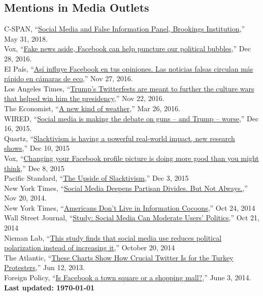 \documentclass[margin,line,11pt]{resume}
\newcommand{\nl}{\vspace{0.10in}\\}
\begin{document}
\begin{resume}
                \section{\mysidestyle Mentions in Media Outlets}
C-SPAN, ``\href{https://www.c-span.org/video/?446330-3/social-media-false-information-panel-2}{Social Media and False Information Panel, Brookings Institution},'' May 31, 2018.\nl                
Vox, ``\href{http://www.vox.com/the-big-idea/2016/12/28/14095452/fake-news-political-bubbles-democracy-facebook}{Fake news aside, Facebook can help puncture our political bubbles},'' Dec 28, 2016.\nl
El Pa\'{i}s, ``\href{http://internacional.elpais.com/internacional/2016/11/25/actualidad/1480095728_565471.html}{As\'{i} influye Facebook en tus opiniones. Las noticias falsas circulan m\'{a}s r\'{a}pido en c\'{a}maras de eco},'' Nov 27, 2016.\nl
Los Angeles Times, ``\href{http://www.latimes.com/politics/la-na-pol-trump-twitter-20161122-story.html}{Trump's Twitterfests are meant to further the culture wars that helped win him the presidency},'' Nov 22, 2016.\nl 
The Economist, ``\href{http://www.economist.com/news/special-report/21695192-social-media-now-play-key-role-collective-action-new-kind-weather}{A new kind of weather},'' Mar 26, 2016.\nl
WIRED, ``\href{http://www.wired.com/2015/12/social-media-is-making-the-debate-on-guns-and-trump-worse/}{Social media is making the debate on guns -- and Trump -- worse},'' Dec 16, 2015.\nl
Quartz, ``\href{http://qz.com/570009/slacktivism-is-having-a-powerful-real-world-impact-new-research-shows/}{Slacktivism is having a powerful real-world impact, new research shows},'' Dec 10, 2015\nl
Vox, ``\href{http://www.vox.com/2015/12/8/9873822/social-media-activism-science}{Changing your Facebook profile picture is doing more good than you might think},'' Dec 8, 2015\nl
Pacific Standard, ``\href{https://psmag.com/the-upside-of-slacktivism-2a93294941b0#.hp2xyepdf}{The Upside of Slacktivism},'' Dec 3, 2015\nl
New York Times, ``\href{http://www.nytimes.com/2014/11/21/upshot/social-media-deepens-partisan-divides-but-not-always.html?_r=0}{Social Media Deepens Partisan Divides. But Not Always.},'' Nov 20, 2014.\nl
New York Times, ``\href{http://www.nytimes.com/2014/10/25/upshot/americans-dont-live-in-information-cocoons.html?_r=0}{Americans Don't Live in Information Cocoons},'' Oct 24, 2014\nl
Wall Street Journal, ``\href{http://blogs.wsj.com/washwire/2014/10/21/study-social-media-can-moderate-users-politics/}{Study: Social Media Can Moderate Users' Politics},'' Oct 21, 2014\nl
Nieman Lab, ``\href{http://www.niemanlab.org/2014/10/this-study-finds-that-social-media-use-reduces-political-polarization-instead-of-increasing-it/}{This study finds that social media use reduces political polarization instead of increasing it},'' October 20, 2014\nl
The Atlantic, ``\href{http://www.theatlantic.com/international/archive/2013/06/these-charts-show-how-crucial-twitter-is-for-the-turkey-protesters/276798/}{These Charts Show How Crucial Twitter Is for the Turkey Protesters},'' Jun 12, 2013.\nl
Foreign Policy, ``\href{http://foreignpolicy.com/2013/06/03/is-facebook-a-town-square-or-a-shopping-mall/}{Is Facebook a town square or a shopping mall?},'' June 3, 2014.\nl

\centering \textbf{Last updated: \today}
    


\end{resume}
\end{document}
